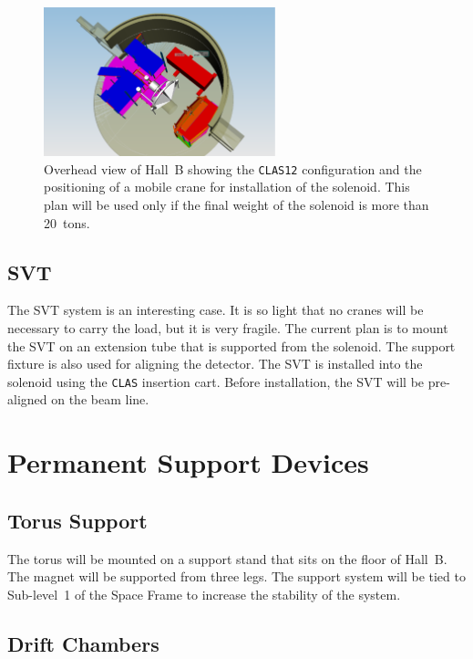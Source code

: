 \begin{figure}[htbp]
\centering
\includegraphics[width=0.6\textwidth]{CLAS12_view_37.eps}
\caption{\small{Overhead view of Hall~B showing the {\tt CLAS12}
configuration and the positioning of a mobile crane for installation
of the solenoid.  This plan will be used only if the final weight
of the solenoid is more than 20~tons.}}
\label{mobile}
\end{figure}

\subsection{SVT}

The SVT system is an interesting case. It is so light that no cranes 
will be necessary to carry the load, but it is very fragile.  The 
current plan is to mount the SVT on an extension tube that is supported
from the solenoid.  The support fixture is also used for aligning the
detector.  The SVT is installed into the solenoid using the {\tt CLAS}
insertion cart.  Before installation, the SVT will be pre-aligned
on the beam line.

\section{Permanent Support Devices}

\subsection{Torus Support}

The torus will be mounted on a support stand that sits on the floor of 
Hall~B.  The magnet will be supported from three legs.  The support
system will be tied to Sub-level~1 of the Space Frame to increase the
stability of the system.

\subsection{Drift Chambers}

